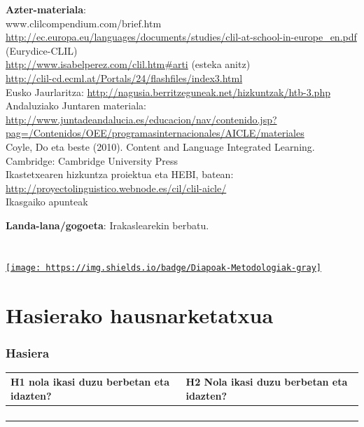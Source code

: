 \documentclass[
]{book}
\begin{document}
\textbf{Azter-materiala}:\\
www.clilcompendium.com/brief.htm\\
\url{http://ec.europa.eu/languages/documents/studies/clil-at-school-in-europe_en.pdf} (Eurydice-CLIL)\\
\url{http://www.isabelperez.com/clil.htm\#arti} (esteka anitz)\\
\url{http://clil-cd.ecml.at/Portals/24/flashfiles/index3.html}~\\
Eusko Jaurlaritza: \url{http://nagusia.berritzeguneak.net/hizkuntzak/htb-3.php}\\
Andaluziako Juntaren materiala: \url{http://www.juntadeandalucia.es/educacion/nav/contenido.jsp?pag=/Contenidos/OEE/programasinternacionales/AICLE/materiales}\\
Coyle, Do eta beste (2010). Content and Language Integrated Learning. Cambridge: Cambridge University Press\\
Ikastetxearen hizkuntza proiektua eta HEBI, batean: \url{http://proyectolinguistico.webnode.es/cil/clil-aicle/}\\
Ikasgaiko apunteak

\textbf{Landa-lana/gogoeta}: Irakaslearekin berbatu.

\hypertarget{section}{%
\chapter{}\label{section}}

\href{../diapoak/7-gaia-Metodologiak.pdf}{\texttt{[image: https://img.shields.io/badge/Diapoak-Metodologiak-gray]}}

\hypertarget{hasierako-hausnarketatxua}{%
\chapter{Hasierako hausnarketatxua}\label{hasierako-hausnarketatxua}}

\hypertarget{hasiera}{%
\subsection{Hasiera}\label{hasiera}}

\begin{longtable}[]{@{}
  >{\raggedright\arraybackslash}p{}
  >{\raggedright\arraybackslash}p{}@{}}
\toprule
H1 nola ikasi duzu berbetan eta idazten? & H2 Nola ikasi duzu berbetan eta idazten? \\
\midrule
\endhead
& \\
& \\
& \\
& \\
\bottomrule
\end{longtable}
\end{document}
